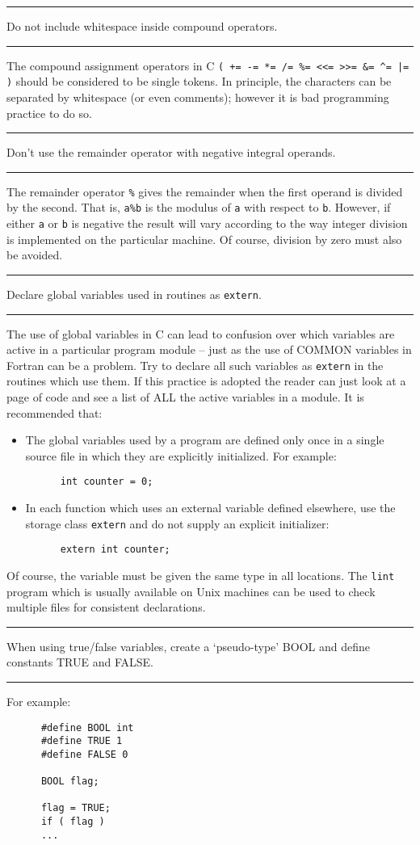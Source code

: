 \documentclass[twoside,11pt]{article}
\newcounter{sruleno}
\newcommand{\srule}[1]{
    \addtocounter{sruleno}{1}
    \goodbreak
    \rule[0.5ex]{\textwidth}{0.3mm}
    {\Large #1 \hfill {\thesruleno}}
    \rule[0.5ex]{\textwidth}{0.1mm}
}
\newcommand{\srule}[1]{
       \addtocounter{sruleno}{1}
       \begin{rawhtml} <HR> \end{rawhtml}
       {\Large \thesruleno}~~~~{\Large #1}
       \begin{rawhtml} <HR> \end{rawhtml}
       \end{tabular}
  }
\begin{document}
\srule{Do not include whitespace inside compound operators.}
The compound assignment operators in C 
\verb~( += -= *= /= %= <<= >>= &= ^= |= )~ 
should be considered to be single tokens. In principle, the characters can 
be separated by whitespace (or even comments); however it is bad programming 
practice to do so.

\srule{Don't use the remainder operator with negative integral operands.}
The remainder operator \verb~%~ gives the remainder when the first operand is
divided by the second. That is, {\tt a\%b} is the modulus of {\tt a} 
with respect to {\tt b}.
However, if either {\tt a} or {\tt b} is negative the result will vary according to the
way integer division is implemented on the particular machine.
Of course, division by zero must also be avoided.


\srule{Declare global variables used in routines as {\tt extern}.}
The use of global variables in C can lead to confusion over which
variables are active in a particular program module --
just as the use of COMMON variables in Fortran can be a problem.
Try to declare  all such variables as {\tt extern} in the routines which 
use them.
If this practice is adopted the reader can just look at a page of code 
and see a list of ALL the active variables in a module.
It is recommended that:
\begin{itemize}
\item The global variables used by a program are defined only once 
in a single source file  in which they are explicitly initialized.
For example:
\begin{verbatim}
      int counter = 0;
\end{verbatim}
\item In each function which uses an external variable defined elsewhere,
 use the storage class {\tt extern} and do not supply
an explicit initializer:
\begin{verbatim}
      extern int counter;
\end{verbatim}
\end{itemize}
Of course, the variable must be given the same type in all 
locations.
The {\tt lint} program which is usually available on Unix machines can be 
used to check multiple files for consistent declarations.

\srule{When using true/false variables, create a `pseudo-type' BOOL and define
  constants TRUE and FALSE.}
For example:
\begin{verbatim}
      #define BOOL int
      #define TRUE 1
      #define FALSE 0

      BOOL flag;
  
      flag = TRUE;
      if ( flag )  
      ...
\end{verbatim}
\end{document}
